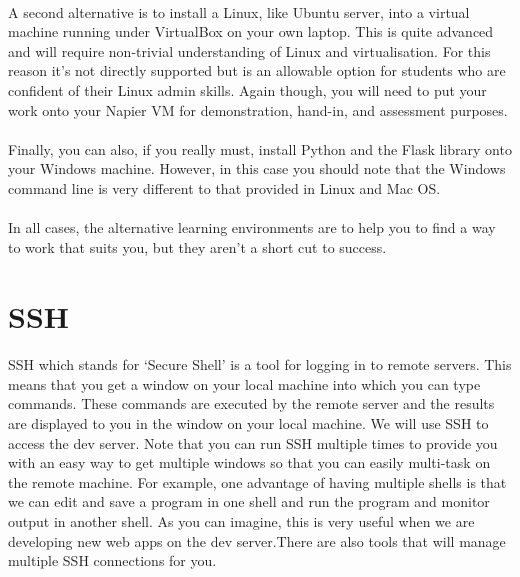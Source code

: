 \documentclass[12pt, a4paper, oneside]{book}
\begin{document}
\paragraph{} A second alternative is to install a Linux, like Ubuntu server, into a virtual machine running under VirtualBox on your own laptop. This is quite advanced and will require non-trivial understanding of Linux and virtualisation. For this reason it's not directly supported but is an allowable option for students who are confident of their Linux admin skills. Again though, you will need to put your work onto your Napier VM for demonstration, hand-in, and assessment purposes.

\paragraph{} Finally, you can also, if you really must, install Python and the Flask library onto your Windows machine. However, in this case you should note that the Windows command line is very different to that provided in Linux and Mac OS.

\paragraph{} In all cases, the alternative learning environments are to help you to find a way to work that suits you, but they aren't a short cut to success.

\section{SSH}
\label{ssh}
\paragraph{} SSH which stands for `Secure Shell' is a tool for logging in to remote servers. This means that you get a window on your local machine into which you can type commands. These commands are executed by the remote server and the results are displayed to you in the window on your local machine. We will use SSH to access the dev server. Note that you can run SSH multiple times to provide you with an easy way to get multiple windows so that you can easily multi-task on the remote machine. For example, one advantage of having multiple shells is that we can edit and save a program in one shell and run the program and monitor output in another shell. As you can imagine, this is very useful when we are developing new web apps on the dev server.There are also tools that will manage multiple SSH connections for you.
\end{document}

